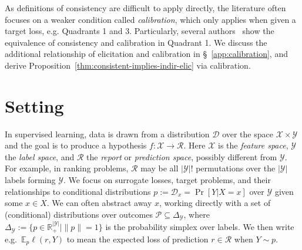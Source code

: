 \documentclass{article} %
\newcommand{\Comments}{0}
\newcommand{\mynote}[2]{\ifnum\Comments=1\textcolor{#1}{#2}\fi}
\newcommand{\raf}[1]{\mynote{green}{[RF: #1]}}
\newcommand{\reals}{\mathbb{R}}
\newcommand{\simplex}{\Delta_\Y}
\newcommand{\D}{\mathcal{D}}
\newcommand{\E}{\mathbb{E}}
\newcommand{\R}{\mathcal{R}}
\renewcommand{\P}{\mathcal{P}}
\newcommand{\X}{\mathcal{X}}
\newcommand{\Y}{\mathcal{Y}}
\begin{document}
As definitions of consistency are difficult to apply directly, the literature often focuses on a weaker condition called \emph{calibration}, which only applies when given a target loss, e.g. Quadrants 1 and 3. 
Particularly, several authors~\citep{zhang2004statistical, lin2004note,bartlett2006convexity,tewari2007consistency,ramaswamy2016convex} show the equivalence of consistency and calibration in Quadrant 1.
We discuss the additional relationship of elicitation and calibration in \S~\ref{app:calibration}, and derive Proposition~\ref{thm:consistent-implies-indir-elic} via calibration.



\section{Setting}\label{sec:related-work}

In supervised learning, data is drawn from a distribution $\D$ over the space $\X \times \Y$ and the goal is to produce a hypothesis $f: \X \to \R$.
Here $\X$ is the \emph{feature space}, $\Y$ the \emph{label space}, and $\R$ the \emph{report} or \emph{prediction space}, possibly different from $\Y$.
For example, in ranking problems, $\R$ may be all $|\Y|!$ permutations over the $|\Y|$ labels forming $\Y$.
We focus on surrogate losses, target problems, and their relationships to conditional distributions $p := \D_x = \Pr[Y|X=x]$ over $\Y$ given some $x \in X$.
We can often abstract away $x$, working directly with a set of (conditional) distributions over outcomes $\P \subseteq \simplex$, where $\simplex := \{p \in \reals^{|\Y|}_+ \mid \|p\|= 1\}$ is the probability simplex over labels.
We then write e.g.\ $\E_p \ell(r,Y)$ to mean the expected loss of prediction $r \in \R$ when $Y\sim p$.
\end{document}

